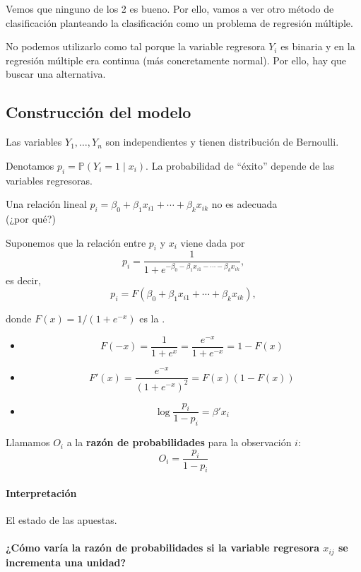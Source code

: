 Vemos que ninguno de los 2 es bueno. Por ello, vamos a ver otro método de clasificación planteando  la clasificación como un problema de regresión múltiple. 

No podemos utilizarlo como tal porque la variable regresora $Y_i$ es binaria y en la regresión múltiple era continua (más concretamente normal). Por ello, hay que buscar una alternativa.


\subsection{Construcción del modelo}
Las variables $Y_1,\ldots,Y_n$ son independientes y tienen distribución de Bernoulli. 

Denotamos $p_i=\mathbb{P}(Y_i=1 \mid x_i)$. La probabilidad de ``éxito'' depende de las variables regresoras.

Una relación lineal $p_i=\beta_0+\beta_1x_{i1}+\cdots+\beta_kx_{ik}$ no es adecuada\\ (¿por qué?)

Suponemos que la relación entre $p_i$ y $x_i$ viene dada por 
\[p_i = \frac{1}{1+e^{-\beta_0-\beta_1x_{i1}-\cdots-\beta_kx_{ik}}},\]
es decir,
\[p_i = F(\beta_0+\beta_1x_{i1}+\cdots+\beta_kx_{ik}),\]

donde $F(x)=1/(1+e^{-x})$ es la .


\obs 

\begin{itemize}
  \item \[F(-x) = \frac{1}{1+e^{x}} = \frac{e^{-x}}{1 + e^{-x}} = 1 - F(x)\]
  \item \[F'(x) = \frac{e^{-x}}{(1+e^{-x})^2} = F(x)(1-F(x))\]
  \item \[\log\frac{p_i}{1-p_i} = β'x_i\]
\end{itemize}


\begin{defn}
Llamamos $O_i$ a la \textbf{razón de probabilidades} para la observación $i$:
\[
 O_i=\frac{p_i}{1-p_i} 
\]
\end{defn}
\paragraph{Interpretación} El estado de las apuestas. 


\paragraph{¿Cómo varía la razón de probabilidades si la variable regresora $x_{ij}$ se incrementa una unidad?}

